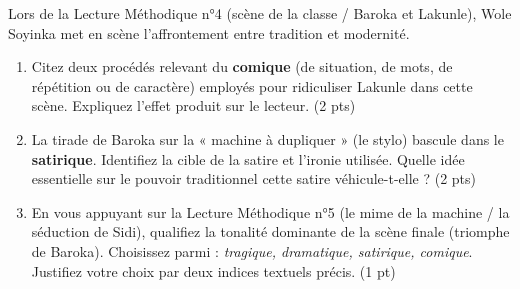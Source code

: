 \documentclass[11pt]{article}
\begin{document}
\begin{exercice}
Lors de la Lecture Méthodique n°4 (scène de la classe / Baroka et Lakunle), Wole Soyinka met en scène l'affrontement entre tradition et modernité.

\begin{enumerate}
    \item Citez deux procédés relevant du \textbf{comique} (de situation, de mots, de répétition ou de caractère) employés pour ridiculiser Lakunle dans cette scène. Expliquez l'effet produit sur le lecteur. (2 pts)
    \item La tirade de Baroka sur la « machine à dupliquer » (le stylo) bascule dans le \textbf{satirique}. Identifiez la cible de la satire et l'ironie utilisée. Quelle idée essentielle sur le pouvoir traditionnel cette satire véhicule-t-elle ? (2 pts)
    \item En vous appuyant sur la Lecture Méthodique n°5 (le mime de la machine / la séduction de Sidi), qualifiez la tonalité dominante de la scène finale (triomphe de Baroka). Choisissez parmi : \textit{tragique, dramatique, satirique, comique}. Justifiez votre choix par deux indices textuels précis. (1 pt)
\end{enumerate}
\end{exercice}
\end{document}
